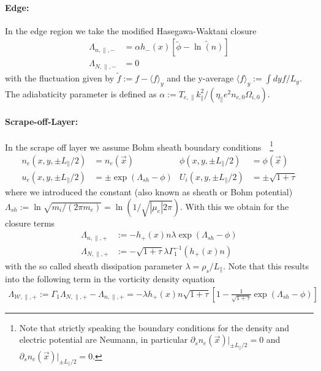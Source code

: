 \paragraph{Edge:} In the edge region we take the modified Hasegawa-Waktani 
closure~\cite{Held2018}
\begin{align}
 \Lambda_{n,\parallel,-} &= \alpha h_{-}(x) \left[\widetilde{\phi} - 
\widetilde{\ln(n)} \right] \\
 \Lambda_{N,\parallel,-} &= 0
\end{align}
with the fluctuation given by \(\widetilde{f} := f - \langle f\rangle_y\) and 
the y-average \(\langle f\rangle_y:= \int dy f / L_y\). The adiabaticity 
parameter is defined as \(\alpha := T_{e,\parallel} 
k_\parallel^2/(\eta_\parallel e^2 n_{e,0} \Omega_{i,0} )\).

\paragraph{Scrape-off-Layer:} In the scrape off layer we assume Bohm sheath 
boundary conditions~\cite{Mosetto2015}~\footnote{Note that strictly speaking the 
boundary conditions for the density and electric potential are Neumann, in 
particular \(\partial_s n_e (\vec{x}) |_{\pm L_\parallel /2 } =0 \) and 
\(\partial_s  n_e (\vec{x}) |_{\pm L_\parallel /2 } = 0\).}
\begin{align}
n_e (x,y,\pm L_\parallel /2 ) &= n_e (\vec{x}) &
\phi (x,y,\pm L_\parallel /2 ) &= \phi (\vec{x})\\
 u_e (x,y,\pm L_\parallel /2 ) &= \pm \exp{(\Lambda_{sh} - \phi)} &
 U_i (x,y,\pm L_\parallel /2 ) &= \pm\sqrt{1+\tau}
\end{align}
where we introduced the constant (also known as sheath or Bohm potential) 
\(\Lambda_{sh} := \ln \sqrt{m_i/(2 \pi m_e)} = \ln  (1/\sqrt{|\mu_e| 2 \pi})\). 
With this we obtain for the closure terms~\cite{HeldPhD}
\begin{align}
 \Lambda_{n,\parallel,+} &:= -h_{+}(x) n \lambda \exp{(\Lambda_{sh} - \phi)} \\
 \Lambda_{N,\parallel,+} &:=  -\sqrt{1 + \tau} \lambda \Gamma_1^{-1} ( h_{+}(x)  
n)
\end{align}
with the so called sheath dissipation parameter \(\lambda = 
\rho_s/L_\parallel\).
Note that this results into the following term in the vorticity density equation
\begin{align}
 \Lambda_{\mathcal{W},\parallel,+} := \Gamma_1\Lambda_{N,\parallel,+} - 
\Lambda_{n,\parallel,+} = -\lambda  h_{+}(x)  n \sqrt{1 + \tau} \left[1  -  
\frac{1}{\sqrt{1 + \tau}}\exp{(\Lambda_{sh} - \phi)} \right]
\end{align}
